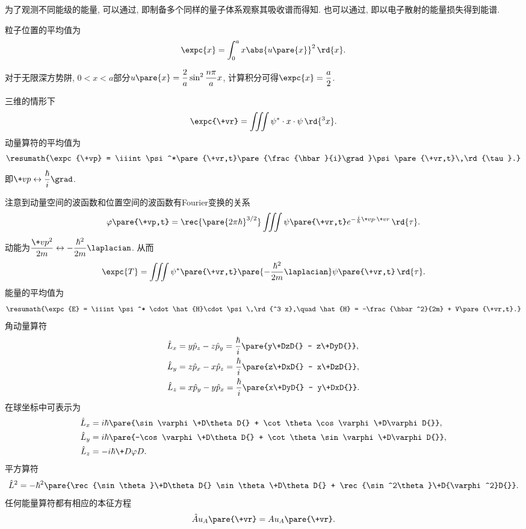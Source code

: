 \documentclass[hidelinks]{ctexart}
\begin{document}
为了观测不同能级的能量, 可以通过, 即制备多个同样的量子体系观察其吸收谱而得知. 也可以通过, 即以电子散射的能量损失得到能谱.
\par
粒子位置的平均值为
\[ \expc{x} = \int_0^a x\abs{u\pare{x}}^2\,\rd{x}. \]
\begin{sample}
    \begin{ex}
        对于无限深方势阱, $0<x<a$部分$\displaystyle u\pare{x} = \frac{2}{a}\sin^2 \frac{n\pi}{a}x$, 计算积分可得$\displaystyle \expc{x} = \frac{a}{2}$.
    \end{ex}
\end{sample}
三维的情形下
\[ \expc{\+vr} = \iiint \psi^* \cdot x\cdot \psi \,\rd{^3 x}. \]
动量算符的平均值为
\[ \resumath{\expc{\+vp} = \iiint \psi^*\pare{\+vr,t}\pare{\frac{\hbar}{i}\grad}\psi\pare{\+vr,t}\,\rd{\tau}.} \]
即$\displaystyle \+vp\leftrightarrow \frac{\hbar}{i}\grad$.
\par
注意到动量空间的波函数和位置空间的波函数有Fourier变换的关系
\[ \varphi\pare{\+vp,t} = \rec{\pare{2\pi\hbar}^{3/2}}\iiint \psi\pare{\+vr,t} e^{-\frac{i}{\hbar}\+vp\cdot \+vr}\,\rd{\tau}. \]
动能为$\displaystyle \frac{\+vp^2}{2m}\leftrightarrow -\frac{\hbar^2}{2m}\laplacian$. 从而
\[ \expc{T} = \iiint \psi^*\pare{\+vr,t} \pare{-\frac{\hbar^2}{2m}\laplacian}\psi\pare{\+vr,t}\,\rd{\tau}. \]
能量的平均值为
\[ \resumath{\expc{E} = \iiint \psi^* \cdot \hat{H}\cdot \psi \,\rd{^3 x},\quad \hat{H} = -\frac{\hbar^2}{2m} + V\pare{\+vr,t}.} \]
角动量算符
\begin{align*}
    \hat{L}_x &= y\hat{p}_z - z\hat{p}_y = \frac{\hbar}{i} \pare{y\+DzD{} - z\+DyD{}}, \\
    \hat{L}_y &= z\hat{p}_x - x\hat{p}_z = \frac{\hbar}{i} \pare{z\+DxD{} - x\+DzD{}}, \\
    \hat{L}_z &= x\hat{p}_y - y\hat{p}_x = \frac{\hbar}{i} \pare{x\+DyD{} - y\+DxD{}}.
\end{align*}
在球坐标中可表示为
\begin{align*}
    \hat{L}_x &= i\hbar\pare{\sin\varphi \+D\theta D{} + \cot \theta \cos\varphi \+D\varphi D{}}, \\
    \hat{L}_y &= i\hbar\pare{-\cos\varphi \+D\theta D{} + \cot \theta \sin\varphi \+D\varphi D{}}, \\
    \hat{L}_z &= -i\hbar\+D\varphi D{}.
\end{align*}
平方算符
\[ \hat{L}^2 = -\hbar^2\pare{\rec{\sin\theta}\+D\theta D{} \sin\theta \+D\theta D{} + \rec{\sin^2\theta}\+D{\varphi^2}D{}}. \]
任何能量算符都有相应的本征方程
\[ \hat{A} u_A\pare{\+vr} = Au_A\pare{\+vr}. \]
\end{document}
